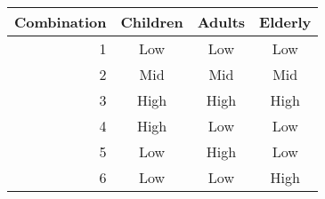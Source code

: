 \begin{tabular}[t]{rccc}
\toprule
\multicolumn{1}{c}{Combination} & Children & Adults & Elderly \\
\midrule
1     & Low   & Low   & Low \\
2     & Mid   & Mid   & Mid \\
3     & High  & High  & High \\
4     & High  & Low   & Low \\
5     & Low   & High  & Low \\
6     & Low   & Low   & High \\
\bottomrule
\end{tabular}%
